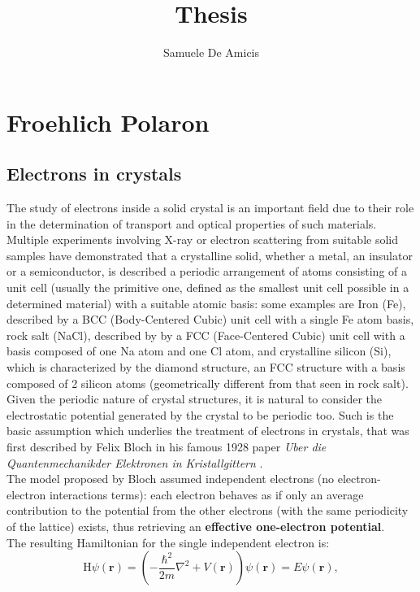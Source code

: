 \documentclass[12pt, a4paper]{report}
\title{Thesis}
\author{Samuele De Amicis}
\numberwithin{equation}{section}
\begin{document}
\maketitle

\chapter{Froehlich Polaron}
\section{Electrons in crystals}
The study of electrons inside a solid crystal is an important field due to their role in the determination of transport
and optical properties of such materials.\\
Multiple experiments involving X-ray or electron scattering from suitable solid samples have demonstrated that a crystalline solid, 
whether a metal, an insulator or a semiconductor, is described a periodic arrangement of atoms consisting of a unit cell 
(usually the primitive one, defined as the smallest unit cell possible in a determined material) with a suitable 
atomic basis: some examples are Iron (Fe), described by a BCC (Body-Centered Cubic) unit cell with a single Fe atom basis, 
rock salt (NaCl), described by by a FCC (Face-Centered Cubic) unit cell with a basis composed of one Na atom and one Cl atom, and 
crystalline silicon (Si), which is characterized by the diamond structure, an FCC structure with a basis composed of 2 silicon atoms 
(geometrically different from that seen in rock salt). \\
Given the periodic nature of crystal structures, it is natural to consider the electrostatic potential generated by the crystal to 
be periodic too. Such is the basic assumption which underlies the treatment of electrons in crystals, that was first described by 
Felix Bloch in his famous 1928 paper \textit{Uber die Quantenmechanikder Elektronen in Kristallgittern} \cite{bloch1928quantum}.\\
The model proposed by Bloch assumed independent electrons (no electron-electron interactions terms): each electron behaves as 
if only an average contribution to the potential from the other electrons (with the same periodicity of the lattice) exists, thus 
retrieving an \textbf{effective one-electron potential}.\\
The resulting Hamiltonian for the single independent electron is:
\begin{equation}
    \mathrm{H}\psi(\mathbf{r})=\left(-\frac{\hbar^2}{2m}\nabla^2+V(\mathbf{r})\right)\psi(\mathbf{r})=E\psi(\mathbf{r}),
    \label{eq_0_00}
\end{equation}
\end{document}
